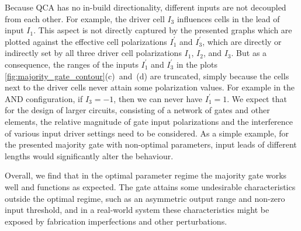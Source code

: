 Because QCA has no in-build directionality, different inputs are not decoupled
from each other. For example, the driver cell $I_3$ influences cells in the lead
of input $I_1$. This aspect is not directly captured by the presented graphs
which are plotted against the effective cell polarizations $I_1^{\prime}$ and
$I_3^{\prime}$, which are directly or indirectly set by all three driver cell
polarizations $I_1$, $I_2$, and $I_3$. But as a consequence, the ranges of the
inputs $I_1^{\prime}$ and $I_3^{\prime}$ in the plots
\ref{fig:majority_gate_contour}(c)~and~(d) are truncated, simply because the
cells next to the driver cells never attain some polarization values. For
example in the AND configuration, if $I_3 = -1$, then we can never have
$I_1^{\prime} = 1$. We expect that for the design of larger circuits, consisting
of a network of gates and other elements, the relative magnitude of gate input
polarizations and the interference of various input driver settings need to be
considered. As a simple example, for the presented majority gate with
non-optimal parameters, input leads of different lengths would significantly
alter the behaviour.

Overall, we find that in the optimal parameter regime the majority gate works
well and functions as expected. The gate attains some undesirable
characteristics outside the optimal regime, such as an asymmetric output range
and non-zero input threshold, and in a real-world system these characteristics
might be exposed by fabrication imperfections and other perturbations.

